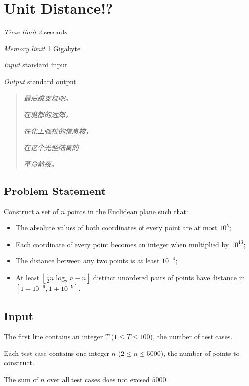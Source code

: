 \section[D. Unit Distance!?]{ Unit Distance!?}

\textit{Time limit}   2 seconds

\textit{Memory limit} 1 Gigabyte

\textit{Input} \qquad standard input

\textit{Output} \qquad standard output


\begin{quote}
	\textit{最后跳支舞吧。}

	\textit{在魔都的远郊，}

	\textit{在化工强校的信息楼，}

	\textit{在这个光怪陆离的}

	\textit{革命前夜。}
\end{quote}

\subsection{Problem Statement}

Construct a set of $n$ points in the Euclidean plane such that:

\begin{itemize}
	\item The absolute values of both coordinates of every point are at most $10^5$;
	\item Each coordinate of every point becomes an integer when multiplied by $10^{13}$;
	\item The distance between any two points is at least $10^{-4}$;
	\item At least $\left\lfloor \frac12 n\log_2 n-n \right\rfloor$ distinct unordered pairs of points have distance in $[1-10^{-9},1+10^{-9}]$.
\end{itemize}


\subsection{Input}

The first line contains an integer $T$ ($1 \le T \le 100$), the number of test cases.

Each test case contains one integer $n$ ($2 \le n \le 5000$), the number of points to construct.

The sum of $n$ over all test cases does not exceed $5000$.

